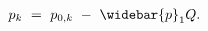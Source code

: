 \begin{equation}
\begin{split}
	p_{k} \
	& = \ p_{0,k} \ - \ \widebar{p}_{1} Q.
\end{split}
\label{Equation:Firms-Problem_Oil-Prices}
\end{equation}